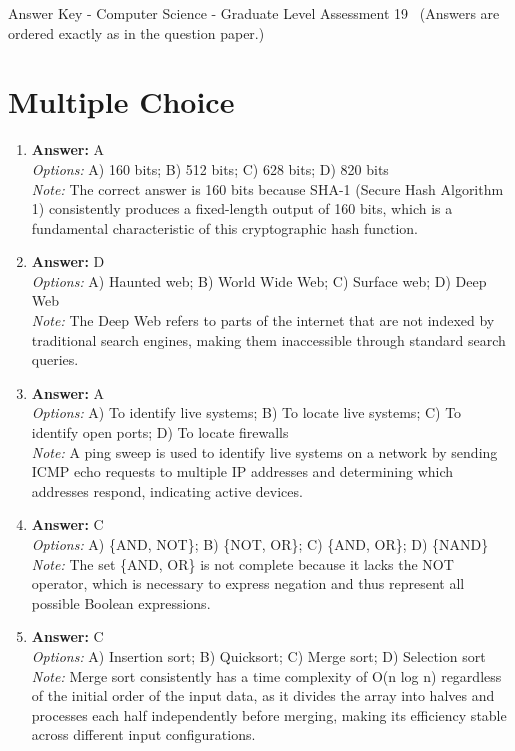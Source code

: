 \documentclass[12pt]{article}
\begin{document}
\begin{center}
Answer Key - Computer Science - Graduate Level Assessment 19 \
\small (Answers are ordered exactly as in the question paper.)
\end{center}

\section*{Multiple Choice}
\begin{enumerate}[label=\arabic*.]
\item \textbf{Answer:} A
\\ \textit{Options:} A) 160 bits; B) 512 bits; C) 628 bits; D) 820 bits
\\ \textit{Note:} The correct answer is 160 bits because SHA-1 (Secure Hash Algorithm 1) consistently produces a fixed-length output of 160 bits, which is a fundamental characteristic of this cryptographic hash function.
\item \textbf{Answer:} D
\\ \textit{Options:} A) Haunted web; B) World Wide Web; C) Surface web; D) Deep Web
\\ \textit{Note:} The Deep Web refers to parts of the internet that are not indexed by traditional search engines, making them inaccessible through standard search queries.
\item \textbf{Answer:} A
\\ \textit{Options:} A) To identify live systems; B) To locate live systems; C) To identify open ports; D) To locate firewalls
\\ \textit{Note:} A ping sweep is used to identify live systems on a network by sending ICMP echo requests to multiple IP addresses and determining which addresses respond, indicating active devices.
\item \textbf{Answer:} C
\\ \textit{Options:} A) \{AND, NOT\}; B) \{NOT, OR\}; C) \{AND, OR\}; D) \{NAND\}
\\ \textit{Note:} The set \{AND, OR\} is not complete because it lacks the NOT operator, which is necessary to express negation and thus represent all possible Boolean expressions.
\item \textbf{Answer:} C
\\ \textit{Options:} A) Insertion sort; B) Quicksort; C) Merge sort; D) Selection sort
\\ \textit{Note:} Merge sort consistently has a time complexity of O(n log n) regardless of the initial order of the input data, as it divides the array into halves and processes each half independently before merging, making its efficiency stable across different input configurations.
\end{enumerate}
\end{document}
